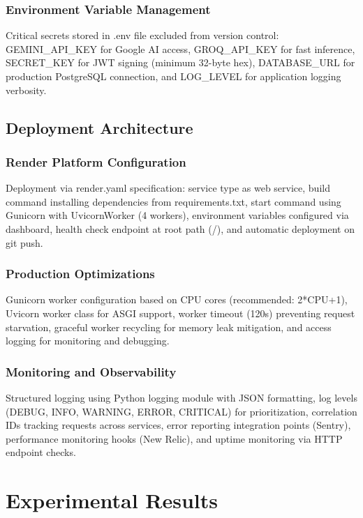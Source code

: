 \documentclass[conference]{IEEEtran}
\begin{document}
\subsubsection{Environment Variable Management}
Critical secrets stored in .env file excluded from version control: GEMINI\_API\_KEY for Google AI access, GROQ\_API\_KEY for fast inference, SECRET\_KEY for JWT signing (minimum 32-byte hex), DATABASE\_URL for production PostgreSQL connection, and LOG\_LEVEL for application logging verbosity.

\subsection{Deployment Architecture}

\subsubsection{Render Platform Configuration}
Deployment via render.yaml specification: service type as web service, build command installing dependencies from requirements.txt, start command using Gunicorn with UvicornWorker (4 workers), environment variables configured via dashboard, health check endpoint at root path (/), and automatic deployment on git push.

\subsubsection{Production Optimizations}
Gunicorn worker configuration based on CPU cores (recommended: 2*CPU+1), Uvicorn worker class for ASGI support, worker timeout (120s) preventing request starvation, graceful worker recycling for memory leak mitigation, and access logging for monitoring and debugging.

\subsubsection{Monitoring and Observability}
Structured logging using Python logging module with JSON formatting, log levels (DEBUG, INFO, WARNING, ERROR, CRITICAL) for prioritization, correlation IDs tracking requests across services, error reporting integration points (Sentry), performance monitoring hooks (New Relic), and uptime monitoring via HTTP endpoint checks.

\section{Experimental Results}
\end{document}
